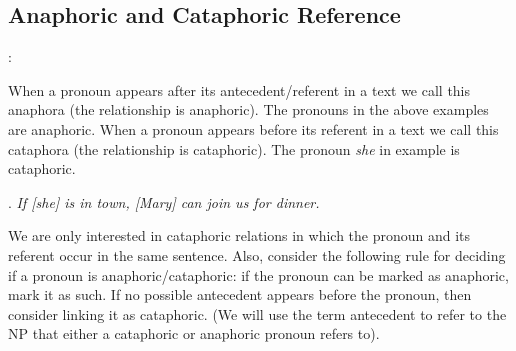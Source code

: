 \documentclass[a4paper]{article}
\begin{document}
\subsection{Anaphoric and Cataphoric Reference}

\cite[p. 4]{GuillouEtAlGuide}:

When a pronoun appears after its antecedent/referent in a text we call this anaphora (the relationship is anaphoric). The pronouns in the above examples are anaphoric. When a pronoun appears before its referent in a text we call this
cataphora (the relationship is cataphoric). The pronoun {\sl she} in example \Next is cataphoric.

\ex.
{\sl If [she] is in town, [Mary] can join us for dinner.}

We are only interested in cataphoric relations in which the pronoun and its referent occur in the same sentence. Also, consider the following rule for deciding if a pronoun is anaphoric/cataphoric: if the pronoun can be marked as anaphoric, mark it as such. If no possible antecedent appears before the pronoun, then consider linking it as cataphoric. (We will use the term antecedent to refer to
the NP that either a cataphoric or anaphoric pronoun refers to).
\end{document}
